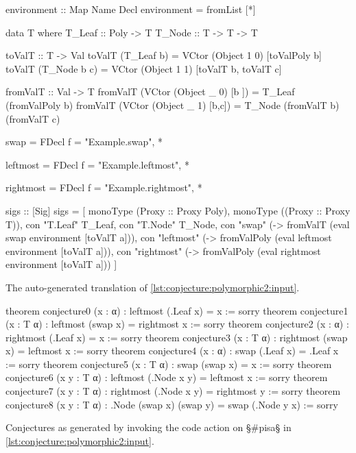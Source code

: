 \begin{listing}[H]
\begin{HaskellCode}
environment :: Map Name Decl
environment = fromList [*\truncated*]

data T where
  T_Leaf :: Poly -> T
  T_Node :: T -> T -> T

toValT :: T -> Val
toValT (T_Leaf b) = VCtor (Object 1 0) [toValPoly b]
toValT (T_Node b c) = VCtor (Object 1 1) [toValT b, toValT c]

fromValT :: Val -> T
fromValT (VCtor (Object _ 0) [b  ]) = T_Leaf (fromValPoly b)
fromValT (VCtor (Object _ 1) [b,c]) = T_Node (fromValT b) (fromValT c)

swap = FDecl {f = "Example.swap", *\truncated*}

leftmost = FDecl {f = "Example.leftmost", *\truncated*}

rightmost = FDecl {f = "Example.rightmost", *\truncated*}

sigs :: [Sig]
sigs =
  [ monoType (Proxy :: Proxy Poly),
    monoType ((Proxy :: Proxy T)),
    con "T.Leaf" T_Leaf,
    con "T.Node" T_Node,
    con "swap" (\a -> fromValT (eval swap environment [toValT a])),
    con "leftmost" (\a -> fromValPoly
      (eval leftmost environment [toValT a])),
    con "rightmost" (\a -> fromValPoly
      (eval rightmost environment [toValT a]))
  ]
\end{HaskellCode}
\caption{The auto-generated translation of \cref{lst:conjecture:polymorphic2:input}.}
\label{lst:conjecture:polymorphic2:code}
\end{listing}

\begin{listing}[H]
\begin{LeanCode}
theorem conjecture0 (x : α)   : leftmost (.Leaf x) = x := sorry
theorem conjecture1 (x : T α) : leftmost (swap x) = rightmost x := sorry
theorem conjecture2 (x : α)   : rightmost (.Leaf x) = x := sorry
theorem conjecture3 (x : T α) : rightmost (swap x) = leftmost x := sorry
theorem conjecture4 (x : α)   : swap (.Leaf x) = .Leaf x := sorry
theorem conjecture5 (x : T α) : swap (swap x) = x := sorry
theorem conjecture6 (x y : T α)
  : leftmost (.Node x y) = leftmost x := sorry
theorem conjecture7 (x y : T α)
  : rightmost (.Node x y) = rightmost y := sorry
theorem conjecture8 (x y : T α)
  : .Node (swap x) (swap y) = swap (.Node y x) := sorry
\end{LeanCode}
\caption
  [Conjectures generated by §\#pisa§ on the code in \cref{lst:conjecture:polymorphic2:input}.]
  {Conjectures as generated by invoking the code action on §\#pisa§ in \cref{lst:conjecture:polymorphic2:input}.}
\label{lst:conjecture:polymorphic2:output}
\end{listing}
